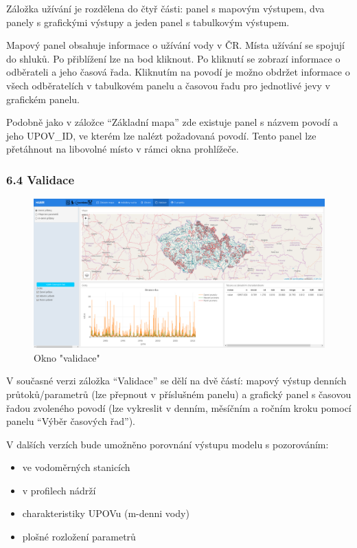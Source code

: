 \documentclass[12pt,]{article}
\providecommand{\tightlist}{%
  \setlength{\itemsep}{0pt}\setlength{\parskip}{0pt}}
\begin{document}
Záložka užívání je rozdělena do čtyř části: panel s mapovým výstupem,
dva panely s grafickými výstupy a jeden panel s tabulkovým výstupem.

Mapový panel obsahuje informace o užívání vody v ČR. Místa užívání se
spojují do shluků. Po přiblížení lze na bod kliknout. Po kliknutí se
zobrazí informace o odběrateli a jeho časová řada. Kliknutím na povodí
je možno obdržet informace o všech odběratelích v tabulkovém panelu a
časovou řadu pro jednotlivé jevy v grafickém panelu.

Podobně jako v záložce \enquote{Základní mapa} zde existuje panel s
názvem povodí a jeho UPOV\_ID, ve kterém lze nalézt požadovaná povodí.
Tento panel lze přetáhnout na libovolné místo v rámci okna prohlížeče.

\subsubsection{6.4 Validace}\label{validace}

\begin{figure}[H]
      \includegraphics[width=\textwidth]{fig/P_validace}
      \caption{Okno "validace"}
      \label{fig:ch5.6}
\end{figure}

V současné verzi záložka \enquote{Validace} se dělí na dvě částí: mapový
výstup denních průtoků/parametrů (lze přepnout v příslušném panelu) a
grafický panel s časovou řadou zvoleného povodí (lze vykreslit v denním,
měsíčním a ročním kroku pomocí panelu \enquote{Výběr časových řad}).

V dalších verzích bude umožněno porovnání výstupu modelu s pozorováním:

\begin{itemize}
\tightlist
\item
  ve vodoměrných stanicích
\item
  v profilech nádrží
\item
  charakteristiky UPOVu (m-denni vody)
\item
  plošné rozložení parametrů
\end{itemize}
\end{document}
